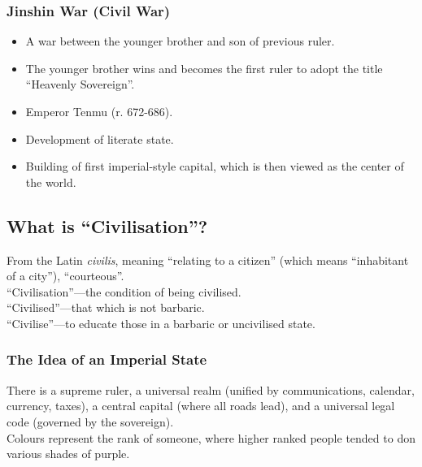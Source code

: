\documentclass[class=article, crop=false]{standalone}
\begin{document}
  \subsubsection{Jinshin War (Civil War)}
  \begin{itemize}
    \item A war between the younger brother and son of previous ruler.
    \item The younger brother wins and becomes the first ruler to adopt the title ``Heavenly Sovereign''.
    \item Emperor Tenmu (r. 672-686).
    \item Development of literate state.
    \item Building of first imperial-style capital, which is then viewed as the center of the world.
  \end{itemize}
  \subsection{What is ``Civilisation''?}
  From the Latin \emph{civilis}, meaning ``relating to a citizen'' (which means ``inhabitant of a city''), ``courteous''. \\
  ``Civilisation''---the condition of being civilised. \\
  ``Civilised''---that which is not barbaric. \\
  ``Civilise''---to educate those in a barbaric or uncivilised state.
  \subsubsection{The Idea of an Imperial State}
  There is a supreme ruler, a universal realm (unified by communications, calendar, currency, taxes), a central capital (where all roads lead), and a universal legal code (governed by the sovereign). \\
  Colours represent the rank of someone, where higher ranked people tended to don various shades of purple.
\end{document}
